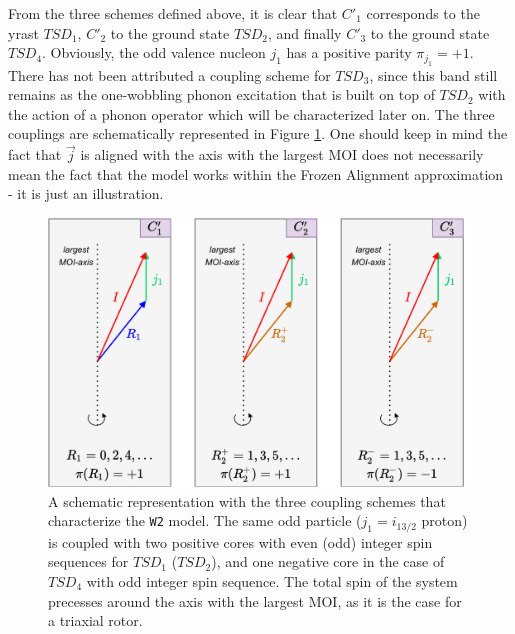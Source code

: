 \documentclass[myclassdoc,debug]{rjparticle}
\begin{document}
From the three schemes defined above, it is clear that $C'_1$ corresponds to the yrast $TSD_1$, $C'_2$ to the ground state $TSD_2$, and finally $C'_3$ to the ground state $TSD_4$. Obviously, the odd valence nucleon $j_1$ has a positive parity $\pi_{j_1}=+1$. There has not been attributed a coupling scheme for $TSD_3$, since this band still remains as the one-wobbling phonon excitation that is built on top of $TSD_2$ with the action of a phonon operator which will be characterized later on. The three couplings are schematically represented in Figure \ref{three-couplings}. One should keep in mind the fact that $\vec{j}$ is aligned with the axis with the largest MOI does not necessarily mean the fact that the model works within the Frozen Alignment approximation - it is just an illustration.

\begin{figure}
    \centering
    \includegraphics[scale=0.7]{figs/coupling_schemes_C1C2C3.pdf}
    \caption{A schematic representation with the three coupling schemes that characterize the \texttt{W2} model. The same odd particle ($j_1=i_{13/2}$ proton) is coupled with two positive cores with even (odd) integer spin sequences for $TSD_1$ ($TSD_2$), and one negative core in the case of $TSD_4$ with odd integer spin sequence. The total spin of the system precesses around the axis with the largest MOI, as it is the case for a triaxial rotor.}
    \label{three-couplings}
\end{figure}
\end{document}
